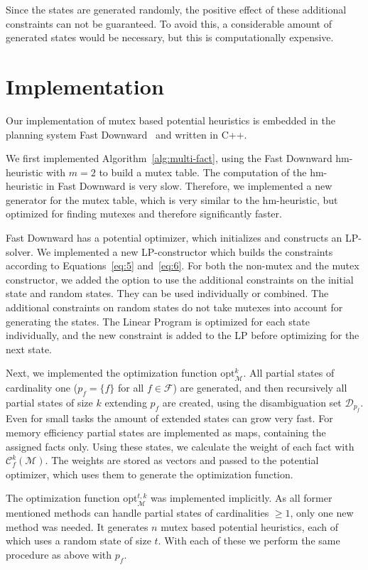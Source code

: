 Since the states are generated randomly, the positive effect of these additional constraints can not be guaranteed.
To avoid this, a considerable amount of generated states would be necessary, but this is computationally expensive.

\section{Implementation}\label{sec:implementation}
Our implementation of mutex based potential heuristics is embedded in the planning system Fast Downward~\citep{helmert2006fast} and written in C++.

We first implemented Algorithm~\ref{alg:multi-fact}, using the Fast Downward hm-heuristic with $m=2$ to build a mutex table.
The computation of the hm-heuristic in Fast Downward is very slow.
Therefore, we implemented a new generator for the mutex table, which is very similar to the hm-heuristic, but optimized for finding mutexes and therefore significantly faster.

Fast Downward has a potential optimizer, which initializes and constructs an LP-solver.
We implemented a new LP-constructor which builds the constraints according to Equations~\eqref{eq:5} and~\eqref{eq:6}.
For both the non-mutex and the mutex constructor, we added the option to use the additional constraints on the initial state and random states.
They can be used individually or combined.
The additional constraints on random states do not take mutexes into account for generating the states.
The Linear Program is optimized for each state individually, and the new constraint is added to the LP before optimizing for the next state.

Next, we implemented the optimization function $\mathrm{opt}^k_\mathcal{M}$.
All partial states of cardinality one ($p_f = \{f\}$ for all $f\in\mathcal{F}$) are generated, and then recursively all partial states of size $k$ extending $p_f$ are created, using the disambiguation set $\mathcal{D}_{p_f}$.
Even for small tasks the amount of extended states can grow very fast.
For memory efficiency partial states are implemented as maps, containing the assigned facts only.
Using these states, we calculate the weight of each fact with $\mathcal{C}_f^k(\mathcal{M})$.
The weights are stored as vectors and passed to the potential optimizer, which uses them to generate the optimization function.

The optimization function $\mathrm{opt}^{t,k}_\mathcal{M}$ was implemented implicitly.
As all former mentioned methods can handle partial states of cardinalities $\geq 1$, only one new method was needed.
It generates $n$ mutex based potential heuristics, each of which uses a random state of size $t$.
With each of these we perform the same procedure as above with $p_f$.

